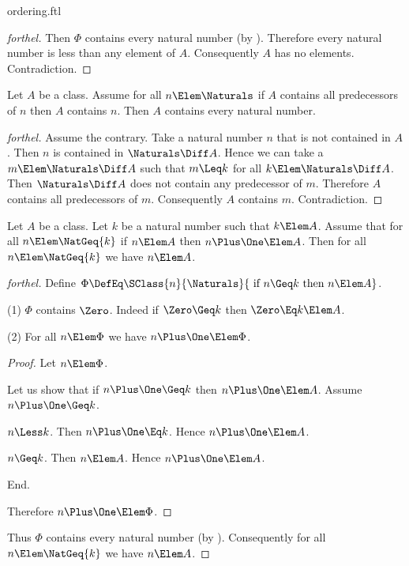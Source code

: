 \documentclass{stex}
\begin{document}
\begin{smodule}{ordering.ftl}
\begin{proof}[forthel]
  Then $\Phi$ contains every natural number (by ).
  Therefore every natural number is less than any element of $A$.
  Consequently $A$ has no elements.
  Contradiction.
\end{proof}

\begin{theorem*}[forthel,name=induction II]
  Let $A$ be a class.
  Assume for all $n \Elem \Naturals$ if $A$ contains all predecessors of $n$ then $A$ contains $n$.
  Then $A$ contains every natural number.
\end{theorem*}
\begin{proof}[forthel]
  Assume the contrary.
  Take a natural number $n$ that is not contained in $A$.
  Then $n$ is contained in $\Naturals \Diff A$.
  Hence we can take a $m \Elem \Naturals \Diff A$ such that $m \Leq k$ for all $k \Elem \Naturals \Diff A$.
  Then $\Naturals \Diff A$ does not contain any predecessor of $m$.
  Therefore $A$ contains all predecessors of $m$.
  Consequently $A$ contains $m$.
  Contradiction.
\end{proof}

\begin{theorem*}[forthel,name=induction III]
  Let $A$ be a class.
  Let $k$ be a natural number such that $k \Elem A$.
  Assume that for all $n \Elem \NatGeq{k}$ if $n \Elem A$ then $n \Plus \One \Elem A$.
  Then for all $n \Elem \NatGeq{k}$ we have $n \Elem A$.
\end{theorem*}
\begin{proof}[forthel]
  Define $\Phi \DefEq \SClass{n}{\Naturals}{\text{ if }n \Geq k\text{ then }n \Elem A}$.

  (1) $\Phi$ contains $\Zero$.
  Indeed if $\Zero \Geq k$ then $\Zero \Eq k \Elem A$.

  (2) For all $n \Elem \Phi$ we have $n \Plus \One \Elem \Phi$.
  \begin{proof}
    Let $n \Elem \Phi$.

    Let us show that if $n \Plus \One \Geq k$ then $n \Plus \One \Elem A$.
      Assume $n \Plus \One \Geq k$.

      \begin{case}{$n \Less k$.}
        Then $n \Plus \One \Eq k$.
        Hence $n \Plus \One \Elem A$.
      \end{case}

      \begin{case}{$n \Geq k$.}
        Then $n \Elem A$.
        Hence $n \Plus \One \Elem A$.
      \end{case}
    End.

    Therefore $n \Plus \One \Elem \Phi$.
  \end{proof}

  Thus $\Phi$ contains every natural number (by ).
  Consequently for all $n \Elem \NatGeq{k}$ we have $n \Elem A$.
\end{proof}

\end{smodule}
\end{document}
